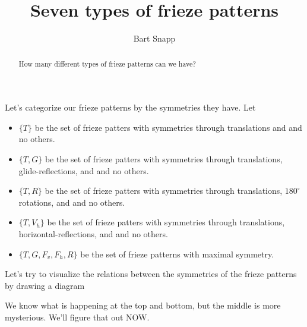 \documentclass[noauthor,nooutcomes,12pt,hints]{ximera}
\author{Bart Snapp}
\title{Seven types of frieze patterns}
\begin{document}
\begin{abstract}
  How many different types of frieze patterns can we have?
\end{abstract}
\maketitle

\begin{listOutcomes}
\item 
\end{listOutcomes}



Let's categorize our frieze patterns by the symmetries they have. Let
\begin{itemize}
  \item $\{T\}$ be the set of frieze patters with symmetries through
    translations and and no others.
  \item $\{T,G\}$ be the set of frieze patters with symmetries through
    translations, glide-reflections, and and no others.
  \item $\{T,R\}$ be the set of frieze patters with symmetries through
    translations, $180^\circ$ rotations, and and no others.
  \item $\{T,V_h\}$ be the set of frieze patters with symmetries
    through translations, horizontal-reflections, and and no
    others.
  \item $\{T,G,F_v,F_h,R\}$ be the set of frieze patterns with maximal
    symmetry.
\end{itemize}
Let's try to visualize the relations between the symmetries of the
frieze patterns by drawing a diagram
\begin{center}
\end{center}
We know what is happening at the top and bottom, but the middle is
more mysterious. We'll figure that out NOW.
\end{document}
